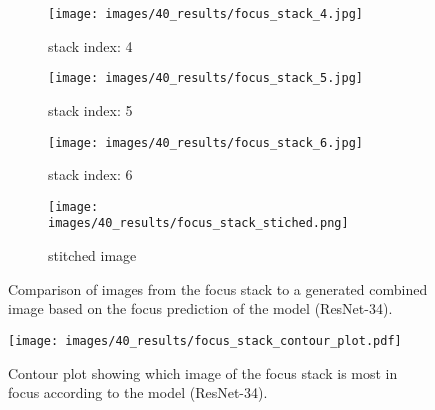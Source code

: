 \begin{figure}
    \centering
    \begin{subfigure}[b]{\textwidth}
        \centering
        \caption{stack index: 4}
        \texttt{[image: images/40\_results/focus\_stack\_4.jpg]}
        \label{fig:Results:Stack:SideBySide:Index0}
    \end{subfigure}
    \begin{subfigure}[b]{\textwidth}
        \centering
        \caption{stack index: 5}
        \texttt{[image: images/40\_results/focus\_stack\_5.jpg]}
        \label{fig:Results:Stack:SideBySide:Index1}
    \end{subfigure}
    \begin{subfigure}[b]{\textwidth}
        \centering
        \caption{stack index: 6}
        \texttt{[image: images/40\_results/focus\_stack\_6.jpg]}
        \label{fig:Results:Stack:SideBySide:Index2}
    \end{subfigure}
    \begin{subfigure}[b]{\textwidth}
        \centering
        \caption{stitched image}
        \texttt{[image: images/40\_results/focus\_stack\_stiched.png]}
        \label{fig:Results:Stack:SideBySide:Stiched}
    \end{subfigure}
    \caption{Comparison of images from the focus stack to a generated combined image based on the focus prediction of the model (ResNet-34).}
    \label{fig:Results:Stack:SideBySide}
\end{figure}


\begin{figure}
    \centering
    \texttt{[image: images/40\_results/focus\_stack\_contour\_plot.pdf]}
    \caption{Contour plot showing which image of the focus stack is most in focus according to the model (ResNet-34).}
    \label{fig:Results:Stack:ContourPlot}
\end{figure}

